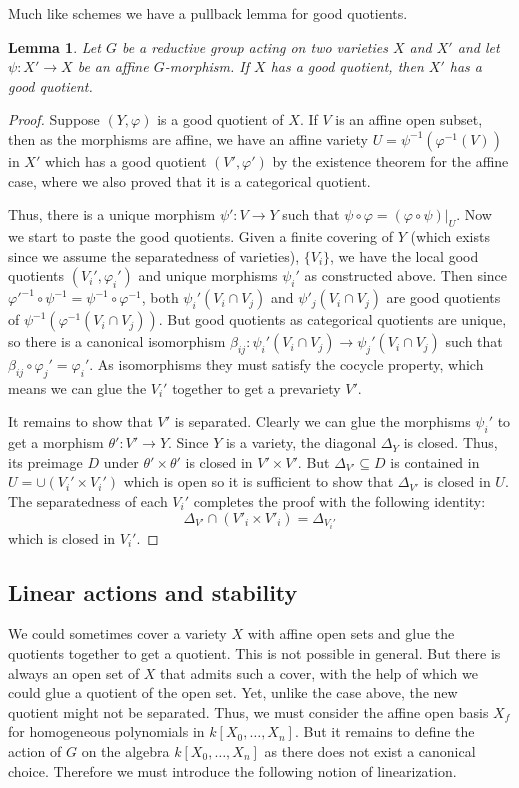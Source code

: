 \documentclass[12pt]{article}
\newtheorem{lemma}{Lemma}[section]
\theoremstyle{remark}
\theoremstyle{definition}
\newcommand{\D}[0]{\Delta}
\begin{document}
    Much like schemes we have a pullback lemma for good quotients.
    \begin{lemma}
        Let $G$ be a reductive group acting on two varieties $X$ and $X'$ and let $\psi:X'\to X$ be an affine $G$-morphism. If $X$ has a good quotient, then $X'$ has a good quotient.
    \end{lemma}
    \begin{proof}
        Suppose $(Y,\varphi)$ is a good quotient of $X$. If $V$ is an affine open subset, then as the morphisms are affine, we have an affine variety $U=\psi^{-1}(\varphi^{-1}(V))$ in $X'$ which has a good quotient $(V', \varphi')$ by the existence theorem for the affine case, where we also proved that it is a categorical quotient.

        Thus, there is a unique morphism $\psi':V\to Y$ such that $\psi\circ\varphi=(\varphi\circ\psi)|_U$. Now we start to paste the good quotients. Given a finite covering of $Y$ (which exists since we assume the separatedness of varieties), $\{V_i\}$, we have the local good quotients $(V_i',\varphi_i')$ and unique morphisms $\psi_i'$ as constructed above. Then since $\varphi'^{-1}\circ\psi^{-1}=\psi^{-1}\circ\varphi^{-1}$, both $\psi_i'(V_i\cap V_j)$ and $\psi'_j(V_i\cap V_j)$ are good quotients of $\psi^{-1}\left(\varphi^{-1}(V_i\cap V_j)\right)$. But good quotients as categorical quotients are unique, so there is a canonical isomorphism $\beta_{ij}:\psi_i'(V_i\cap V_j)\to \psi_j'(V_i\cap V_j)$ such that $\beta_{ij}\circ\varphi_j'=\varphi_i'$. As isomorphisms they must satisfy the cocycle property, which means we can glue the $V_i'$ together to get a prevariety $V'$.
        
        It remains to show that $V'$ is separated. Clearly we can glue the morphisms $\psi_i'$ to get a morphism $\theta':V'\to Y$. Since $Y$ is a variety, the diagonal $\D_Y$ is closed. Thus, its preimage $D$ under $\theta'\times\theta'$ is closed in $V'\times V'$. But $\D_{V'}\subseteq D$ is contained in $U=\cup(V_i'\times V_i')$ which is open so it is sufficient to show that $\D_{V'}$ is closed in $U$. The separatedness of each $V_i'$ completes the proof with the following identity:
        \[\D_{V'}\cap (V'_i\times V'_i)=\D_{V_i'}\]
        which is closed in $V_i'$.
    \end{proof}
    \subsection{Linear actions and stability}
    We could sometimes cover a variety $X$ with affine open sets and glue the quotients together to get a quotient. This is not possible in general. But there is always an open set of $X$ that admits such a cover, with the help of which we could glue a quotient of the open set. Yet, unlike the case above, the new quotient might not be separated. Thus, we must consider the affine open basis $X_f$ for homogeneous polynomials in $k[X_0,\dots, X_n]$. But it remains to define the action of $G$ on the algebra $k[X_0,\dots, X_n]$ as there does not exist a canonical choice. Therefore we must introduce the following notion of linearization.
\end{document}
